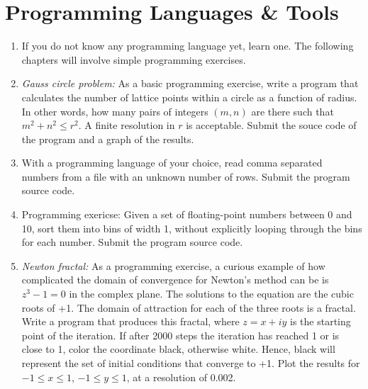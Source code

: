 \documentclass{article}
\begin{document}
\section{Programming Languages \& Tools}

\begin{enumerate}

\item If you do not know any programming language yet, learn one. The following chapters will involve simple programming exercises. 

  
\item {\it Gauss circle problem:}
  As a basic programming exercise, write a program that calculates the number of lattice points within a circle as a function of radius.
In other words, how many pairs of integers $(m,n)$ are there such that $m^2+n^2 \leq  r^2$.
A finite resolution in $r$ is acceptable. Submit the souce code of the program and a graph of the results.


\item 
With a programming language of your choice, read comma separated numbers from a file with an unknown number of rows.
Submit the program source code.


\item
Programming exericse: Given a set of floating-point numbers between 0 and 10, sort them into bins of width 1, without explicitly looping through the bins for each number. Submit the program source code.


\item {\it Newton fractal:}  \label{exrc:fractal}
As a programming exercise, a curious example of how complicated the domain of convergence for Newton's method can be is $z^3-1=0$ in the complex plane.  The solutions to the equation are the cubic roots of +1.  The domain of attraction for each of the three roots is a fractal. Write a program that produces this fractal, where $z=x+iy$ is the starting point of the iteration. If after 2000 steps the iteration has reached 1 or is close to 1, color the coordinate black, otherwise white. Hence, black will represent the set of initial conditions that converge to +1. Plot the results for $-1\leq x \leq 1$, $-1\leq y \leq1$, at a resolution of 0.002.


\end{enumerate}
\end{document}
